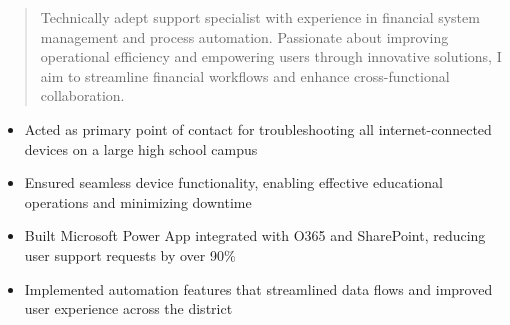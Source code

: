 



\makecvheader

\begin{quote}
  \noindent
  Technically adept support specialist with experience in financial system management and process automation. Passionate about improving operational efficiency and empowering users through innovative solutions, I aim to streamline financial workflows and enhance cross-functional collaboration.
\end{quote}

\par\smallskip
\noindent
\begin{minipage}{20cm}
  \begin{minipage}{9.75cm}
    \begin{itemize}
      \item Acted as primary point of contact for troubleshooting all internet-connected devices on a large high school campus
      \item Ensured seamless device functionality, enabling effective educational operations and minimizing downtime
    \end{itemize}
  \end{minipage}
  \hfill
  \begin{minipage}{9.75cm}
    \begin{itemize}
      \item Built Microsoft Power App integrated with O365 and SharePoint, reducing user support requests by over 90\%
      \item Implemented automation features that streamlined data flows and improved user experience across the district
    \end{itemize}
  \end{minipage}
\end{minipage}
\par\smallskip
\divider

